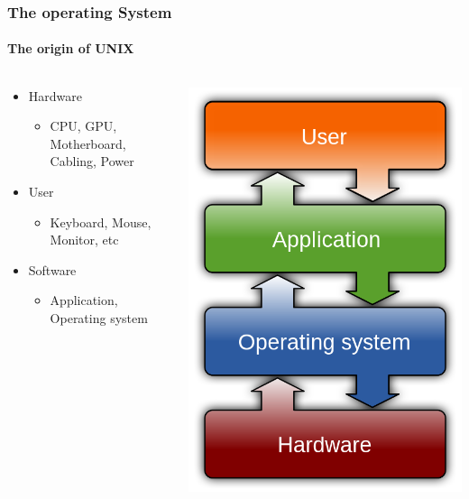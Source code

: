 \documentclass[unknownkeysallowed, 10pt, a4 paper, handout]{beamer}
\begin{document}
\begin{frame}[label=pdp11]
  \frametitle{The operating System}
  \framesubtitle{The origin of UNIX}
  \begin{columns}
    \begin{column}{0.50\textwidth}
      \begin{itemize}
        \item Hardware
      \begin{itemize}
        \item CPU, GPU, Motherboard, Cabling, Power
        \end{itemize}
        \item User
      \begin{itemize}
        \item Keyboard, Mouse, Monitor, etc
        \end{itemize}
        \item Software
      \begin{itemize}
        \item Application, Operating system
        \end{itemize}
      \end{itemize}
    \end{column}
    \begin{column}{0.50\textwidth}
      \begin{center}
        \includegraphics[scale=0.15]{pics/os.png}

\end{center}
\end{column}
\end{columns}
\end{frame}
\end{document}
